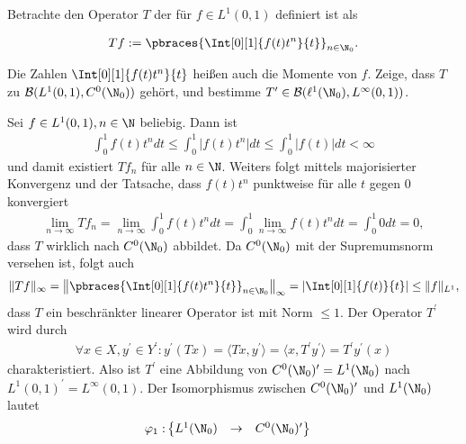 \begin{exercise}[18/1]

Betrachte den Operator $T$ der für $f \in L^1(0, 1)$ definiert ist als

\begin{align*}
  T f
  :=
  \pbraces{\Int[0][1]{f(t) t^n}{t}}_{n \in \N_0}.
\end{align*}

Die Zahlen $\Int[0][1]{f(t) t^n}{t}$ heißen auch die Momente von $f$.
Zeige, dass $T$ zu $\mathcal{B}(L^1(0, 1), C^0(\N_0))$ gehört, und bestimme $T^\prime \in \mathcal{B}(\ell^1(\N_0), L^\infty(0, 1))$.

\end{exercise}

\begin{solution}
Sei $f \in L^1(0,1), n \in \N$ beliebig. Dann ist
\begin{align*}
  \int_0^1 f(t)t^n dt \leq   \int_0^1|f(t)t^n|dt \leq \int_0^1 |f(t)| dt < \infty
\end{align*}
und damit existiert $Tf_n$ für alle $n \in \N$. Weiters folgt mittels majorisierter
Konvergenz und der Tatsache, dass $f(t)t^n$ punktweise für alle $t$ gegen $0$ konvergiert
\begin{align*}
  \lim_{n \to \infty} Tf_n = \lim_{n \to \infty} \int_0^1 f(t)t^n dt
  =  \int_0^1 \lim_{n \to \infty}f(t)t^n dt = \int_0^1 0 dt= 0,
\end{align*}
dass $T$ wirklich nach $C^0(\N_0)$ abbildet. Da $C^0(\N_0)$ mit der Supremumsnorm
versehen ist, folgt auch
\begin{align*}
  \|Tf\|_{\infty} = \left\|\pbraces{\Int[0][1]{f(t) t^n}{t}}_{n \in \N_0}\right\|_{\infty} =
  \left|\Int[0][1]{f(t)}{t}\right| \leq \|f\|_{L^1},
\end{align*}
dass $T$ ein beschränkter linearer Operator ist mit Norm $\leq 1$.
Der Operator $T^{\prime}$ wird durch
\begin{align*}
  \forall x \in X, y^{\prime} \in Y^{\prime}:
  y^{\prime}(Tx) = \langle Tx,y^{\prime} \rangle =
  \langle x, T^{\prime}y^{\prime}\rangle = T^{\prime}y^{\prime}(x)
\end{align*}
charakteristiert. Also ist $T^{\prime}$ eine Abbildung von $C^0(\N_0)^{\prime} = L^1(\N_0)$
nach $L^1(0, 1)^{\prime} = L^\infty(0, 1)$.
Der Isomorphismus zwischen $C^0(\N_0)^{\prime}$ und $L^1(\N_0)$ lautet
\begin{align*}
  \varphi_1:& \begin{Bmatrix}
    L^1(\N_0) & \to & C^0(\N_0)^{\prime} \\

\end{Bmatrix}
\end{align*}
\end{solution}
